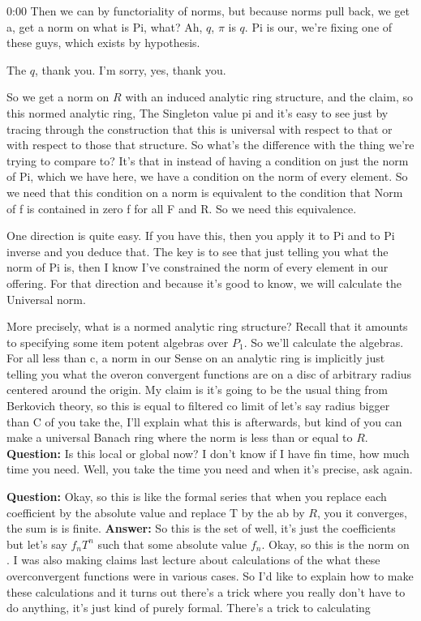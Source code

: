 \begin{unfinished}{0:00}
Then we can by functoriality of norms, but because norms pull back, we get a, get a norm on what is Pi, what? Ah, $q$, $\pi$ is $q$. Pi is our, we're fixing one of these guys, which exists by hypothesis.

The $q$, thank you. I'm sorry, yes, thank you.

So we get a norm on $R$ with an induced analytic ring structure, and the claim, so this normed analytic ring,
The Singleton value pi and it's easy to see just by tracing through the construction that this is universal with respect to that or with respect to those that structure. So what's the difference with the thing we're trying to compare to? It's that in instead of having a condition on just the norm of Pi, which we have here, we have a condition on the norm of every element. So we need that this condition on a norm is equivalent to the condition that Norm of f is contained in zero f for all F and R. So we need this equivalence.

One direction is quite easy. If you have this, then you apply it to Pi and to Pi inverse and you deduce that. The key is to see that just telling you what the norm of Pi is, then I know I've constrained the norm of every element in our offering. For that direction and because it's good to know, we will calculate the Universal norm.

More precisely, what is a normed analytic ring structure? Recall that it amounts to specifying some item potent algebras over $P_1$. So we'll calculate the algebras. For all less than c, a norm in our Sense on an analytic ring is implicitly just telling you what the overon convergent functions are on a disc of arbitrary radius centered around the origin. My claim is it's going to be the usual thing from Berkovich theory, so this is equal to filtered co limit of let's say radius bigger than C of you take the, I'll explain what this is afterwards, but kind of you can make a universal Banach ring where the norm is less than or equal to $R$.
\textbf{Question:} Is this local or global now? I don't know if I have fin time, how much time you need. Well, you take the time you need and when it's precise, ask again.

\textbf{Question:} Okay, so this is like the formal series that when you replace each coefficient by the absolute value and replace T by the ab by $R$, you it converges, the sum is is finite. 
\textbf{Answer:} So this is the set of well, it's just the coefficients but let's say $f_n T^{n}$ such that some absolute value $f_n$. 
Okay, so this is the norm on . I was also making claims last lecture about calculations of the what these overconvergent functions were in various cases. So I'd like to explain how to make these calculations and it turns out there's a trick where you really don't have to do anything, it's just kind of purely formal.
There's a trick to calculating
 

\end{unfinished}
